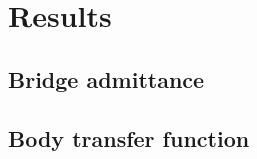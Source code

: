 \section{Results}
\label{sec:results}

\subsection{Bridge admittance}
\label{sec:bridge-admittance}

\subsection{Body transfer function}
\label{sec:transfer-func}